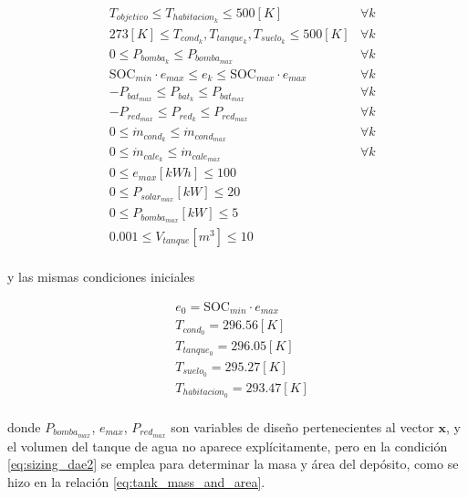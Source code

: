 \begin{align}
	 & T_{objetivo} \leq T_{habitacion_k} \leq 500[K]                                    & \forall k \\
	 & 273[K] \leq T_{cond_k}, T_{tanque_k}, T_{suelo_k} \leq 500[K]                     & \forall k \\
	 & 0 \leq P_{bomba_k} \leq P_{bomba_{max}} \quad                                     & \forall k \\
	 & \text{SOC}_{min} \cdot e_{max} \leq e_k \leq \text{SOC}_{max} \cdot e_{max} \quad & \forall k \\
	 & -P_{bat_{max}} \leq P_{bat_k} \leq P_{bat_{max}} \quad                            & \forall k \\
	 & -P_{red_{max}} \leq P_{red_k} \leq P_{red_{max}} \quad                            & \forall k \\
	 & 0 \leq \dot{m}_{cond_k} \leq \dot{m}_{cond_{max}} \quad                           & \forall k \\
	 & 0 \leq \dot{m}_{cale_k} \leq \dot{m}_{cale_{max}} \quad                           & \forall k \\
	 & 0 \leq e_{max} [kWh] \leq 100                                                                 \\
	 & 0 \leq P_{solar_{max}} [kW] \leq 20                                                           \\
	 & 0 \leq P_{bomba_{max}} [kW] \leq 5                                                            \\
	 & 0.001 \leq V_{tanque} [m^3] \leq 10                                                           \\
\end{align}

y las mismas condiciones iniciales

\begin{align}
	 & e_0 = \text{SOC}_{min} \cdot e_{max} \\
	 & T_{cond_0} = 296.56 [K]              \\
	 & T_{tanque_0} = 296.05[K]             \\
	 & T_{suelo_0} = 295.27[K]              \\
	 & T_{habitacion_0} = 293.47[K]         \\
\end{align}

donde $P_{bomba_{max}}$, $e_{max}$, $P_{red_{max}}$ son variables de diseño
pertenecientes al vector $\mathbf{x}$, y el volumen del tanque de agua no
aparece explícitamente, pero en la condición \eqref{eq:sizing_dae2} se emplea
para determinar la masa y área del depósito, como se hizo en la relación
\eqref{eq:tank_mass_and_area}.

